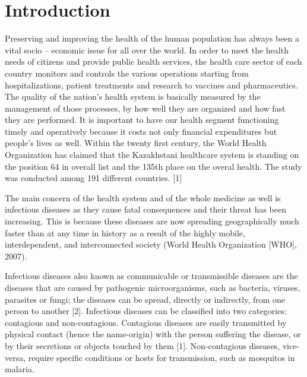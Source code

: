 \chapter{Introduction}

Preserving and improving the health of the human population has always been a vital socio – economic issue for all over the world. In order to meet the health needs of citizens and provide public health services, the health care sector of each country monitors and controls the various operations starting from hospitalizations, patient treatments and research to vaccines and pharmaceutics. The quality of the nation’s health system is basically measured by the management of those processes, by how well they are organized and how fast they are performed. It is important to have our health segment functioning timely and operatively because it costs not only financial expenditures but people’s lives as well. Within the twenty first century, the World Health Organization has claimed that the Kazakhstani healthcare system is standing on the position 64 in overall list and the 135th place on the overal health. The study was conducted among 191 different countries. [1]

The main concern of the health system and of the whole medicine as well is infectious diseases as they cause fatal consequences and their threat has been increasing. This is because these diseases are now spreading geographically much faster than at any time in history as a result of the highly mobile, interdependent, and interconnected society (World Health Organization [WHO], 2007).

Infectious diseases also known as communicable or transmissible diseases are the diseases that are caused by pathogenic microorganisms, such as bacteria, viruses, parasites or fungi; the diseases can be spread, directly or indirectly, from one person to another [2]. Infectious diseases can be classified into two categories: contagious and non-contagious. Contagious diseases are easily transmitted by physical contact (hence the name-origin) with the person suffering the disease, or by their secretions or objects touched by them [1].  Non-contagious diseases, vice-versa, require specific conditions or hosts for transmission, such as mosquitos in malaria.

